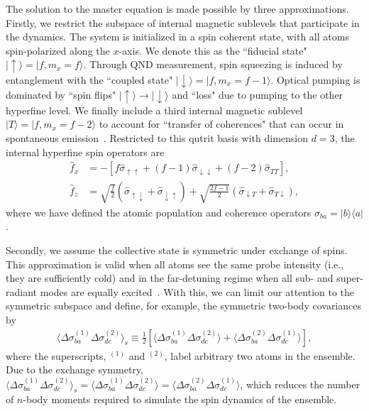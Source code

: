 \documentclass[preprint,aps,pra,onecolumn,superscriptaddress]{revtex4-1} %
\def\bra#1{\langle{#1}\rvert}%
\def\ket#1{\lvert{#1}\rangle}%
\newcommand{\expect}[1]{\big\langle #1 \big\rangle}
\begin{document}
The solution to the master equation is made possible by three approximations. Firstly, we restrict the subspace of internal magnetic sublevels that participate in the dynamics.  The system is initialized in a spin coherent state, with all atoms spin-polarized along the $x$-axis.  We denote this as the ``fiducial state" $\ket{\uparrow} = \ket{f, m_x =f}$.   Through QND measurement, spin squeezing is induced by entanglement with the  ``coupled state"  $\ket{\downarrow} = \ket{f, m_x=f-1}$.  Optical pumping is dominated by ``spin flips" $\ket{\uparrow}\rightarrow \ket{\downarrow}$ and ``loss" due to pumping to the other hyperfine level.  We finally include a third internal magnetic sublevel $\ket{T} = \ket{f, m_x=f-2}$ to account for  ``transfer of coherences" that can occur in spontaneous emission~\cite{Norris2012Enhanced,Norris2014}.  Restricted to this qutrit basis with dimension $ d=3 $, the internal hyperfine spin operators are
\begin{subequations}\label{eq:fxfz_xbasis}
\begin{align}
\hat{f}_x &= -\left[f \hat{\sigma}_{\uparrow \uparrow} +(f-1) \hat{\sigma}_{\downarrow \downarrow} + (f-2)  \hat{\sigma}_{T T}\right], \\
\hat{f}_z &= \sqrt{\frac{f}{2}} \left(\hat{\sigma}_{\uparrow \downarrow} + \hat{\sigma}_{\downarrow \uparrow}\right) + \sqrt{\frac{2f-1}{2}}  \left(\hat{\sigma}_{\downarrow T} + \hat{\sigma}_{T \downarrow }\right),
\end{align}
\end{subequations}
where we have defined the atomic population and coherence operators $\hat{\sigma}_{ba}=\ket{b}\bra{a}$.

Secondly, we assume the collective state is symmetric under exchange of spins. This approximation is valid when all atoms see the same probe intensity (i.e., they are sufficiently cold) and in the far-detuning regime when all sub- and super-radiant modes are equally excited~\cite{Asenjo-Garcia2017Atom,Asenjo-Garcia2017Exponential}. With this, we can limit our attention to the symmetric subspace and define, for example, the symmetric two-body covariances by
\begin{align}
\expect{\Delta\sigma_{ba}^{(1)}\Delta\sigma_{dc}^{(2)}}_s \equiv \frac{1}{2}\left[\expect{\Delta\sigma_{ba}^{(1)}\Delta\sigma_{dc}^{(2)}}+\expect{\Delta\sigma_{ba}^{(2)}\Delta\sigma_{dc}^{(1)}} \right] ,
\end{align}
where the superscripts, $ ^{(1)} $ and $ ^{(2)} $, label arbitrary two atoms in the ensemble. Due to the exchange symmetry, $ \expect{\Delta\sigma_{ba}^{(1)}\Delta\sigma_{dc}^{(2)}}_s=\expect{\Delta\sigma_{ba}^{(1)}\Delta\sigma_{dc}^{(2)}}=\expect{\Delta\sigma_{ba}^{(2)}\Delta\sigma_{dc}^{(1)}} $, which reduces the number of $ n $-body moments required to simulate the spin dynamics of the ensemble.
\end{document}
